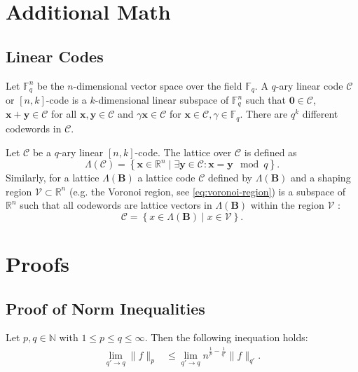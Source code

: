 \chapter{Additional Math}
\section{Linear Codes} \label{sec:linear-code} %
Let $\mathbb{F}_q^n$ be the $n$-dimensional vector space over the field $\mathbb{F}_q$. A $q$-ary linear code $\mathcal{C}$ or $[n, k]$-code \cite{VanLint12} is a $k$-dimensional linear subspace of $\mathbb{F}_q^n$ such that $\mathbf{0} \in \mathcal{C}$, $\mathbf{x} + \mathbf{y} \in \mathcal{C}$ for all $\mathbf{x}, \mathbf{y} \in \mathcal{C}$ and $\gamma \mathbf{x} \in \mathcal{C}$ for $\mathbf{x} \in \mathcal{C}, \gamma \in \mathbb{F}_q$. There are $q^k$ different codewords in $\mathcal{C}$.

Let $\mathcal{C}$ be a $q$-ary linear $[n, k]$-code. The lattice over $\mathcal{C}$ \cite{GJS15} is defined as
\begin{equation}
    \Lambda(\mathcal{C}) = \left\{ \mathbf{x} \in \mathbb{R}^n \mid \exists \mathbf{y} \in \mathcal{C} : \mathbf{x} = \mathbf{y} \mod q  \right\}.
\end{equation} %
Similarly, for a lattice $\Lambda(\mathbf{B})$ a lattice code $\mathcal{C}$ defined by $\Lambda(\mathbf{B})$ and a shaping region $\mathcal{V} \subset \mathbb{R}^n$ (e.g. the Voronoi region, see \cref{eq:voronoi-region}) is a subspace of $\mathbb{R}^n$ such that all codewords are lattice vectors in $\Lambda(\mathbf{B})$ within the region $\mathcal{V}$ \cite{SFS08}:
\begin{equation}
    \mathcal{C} = \left\{ x \in \Lambda(\mathbf{B}) \mid x \in \mathcal{V} \right\}.
\end{equation} %

\chapter{Proofs}
\section{Proof of Norm Inequalities}\label{sec:proof-norm}
Let $p, q \in \mathbb{N}$ with $1 \leq p \leq q \leq \infty$. Then the following inequation holds:
\begin{align}
    \lim_{q' \rightarrow q}\| f \|_p & \leq \lim_{q' \rightarrow q} n^{\frac{1}{p} - \frac{1}{q'}}\| f \|_{q'}.
\end{align}

